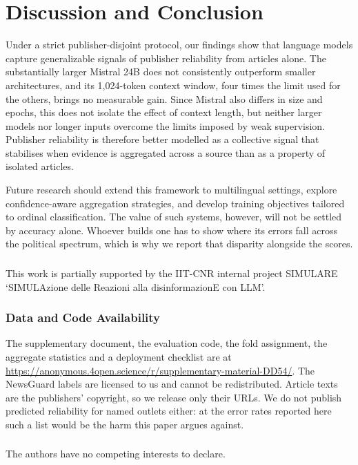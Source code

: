 \documentclass[runningheads]{llncs}
\newif\ifanonymous
\begin{document}
\section{Discussion and Conclusion}
\label{sec:conclusions}
Under a strict publisher-disjoint protocol, our findings show that language models capture generalizable signals of publisher reliability from articles alone. The substantially larger Mistral 24B does not consistently outperform smaller architectures, and its 1,024-token context window, four times the limit used for the others, brings no measurable gain. Since Mistral also differs in size and epochs, this does not isolate the effect of context length, but neither larger models nor longer inputs overcome the limits imposed by weak supervision. Publisher reliability is therefore better modelled as a collective signal that stabilises when evidence is aggregated across a source than as a property of isolated articles.

Future research should extend this framework to multilingual settings, explore confidence-aware aggregation strategies, and develop training objectives tailored to ordinal classification. The value of such systems, however, will not be settled by accuracy alone. Whoever builds one has to show where its errors fall across the political spectrum, which is why we report that disparity alongside the scores.

\begin{credits}
\ifanonymous
\else
  \subsubsection{\ackname}
  This work is partially supported by the IIT-CNR internal project SIMULARE
  `SIMULAzione delle Reazioni alla disinformazionE con LLM'.
\fi

\subsubsection{Data and Code Availability} The supplementary document, the evaluation code, the fold assignment, the aggregate statistics and a deployment checklist are at \url{https://anonymous.4open.science/r/supplementary-material-DD54/}. The NewsGuard labels are licensed to us and cannot be redistributed. Article texts are the publishers' copyright, so we release only their URLs. We do not publish predicted reliability for named outlets either: at the error rates reported here such a list would be the harm this paper argues against.

\subsubsection{\discintname}
The authors have no competing interests to declare.
\end{credits}



\end{document}
